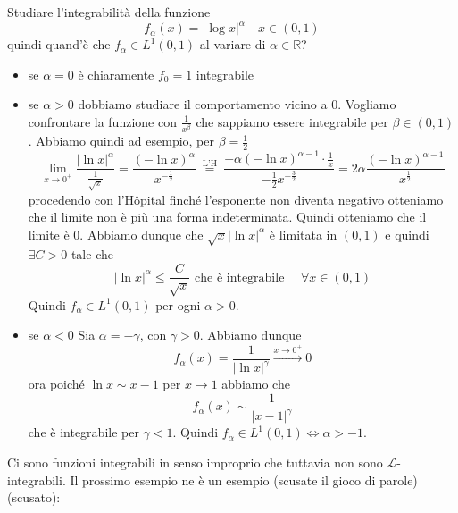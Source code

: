 \begin{eser}
    Studiare l'integrabilità della funzione 
    \[
    f_{\alpha}(x) = {\left| \log x \right|}^{\alpha} \quad x \in (0, 1)
    \]
    quindi quand'è che \(f_\alpha \in L^{1}(0, 1)\) al variare di \(\alpha \in
    \mathbb{R}\)?
\begin{itemize}[label = --]
    \item se \(\alpha = 0\) è chiaramente \(f_0 = 1\) integrabile
    \item se \(\alpha > 0\) dobbiamo studiare il comportamento vicino a \(0\).
        Vogliamo confrontare la funzione con \(\frac{1}{x^{\beta}}\) che
        sappiamo essere integrabile per \(\beta \in (0, 1)\). Abbiamo quindi ad
        esempio, per \(\beta = \frac{1}{2}\) 
        \[
            \lim_{x \to 0^{+}} \frac{{|\ln x|}^{\alpha}}{\frac{1}{\sqrt{x}}} =
            \frac{{(-\ln x)}^{\alpha}}{x^{-\frac{1}{2}}} \overset{\text{ L'H
            }}{=} \frac{- \alpha {(-\ln
            x)}^{\alpha-1} \cdot \frac{1}{x} }{ -\frac{1}{2} x^{-\frac{3}{2}} }
            = 2 \alpha \frac{{(-\ln x)}^{\alpha - 1}}{x^{\frac{1}{2}}}
        \]
        procedendo con l'Hôpital finché l'esponente non diventa negativo
        otteniamo che il limite non è più una forma indeterminata. Quindi
        otteniamo che il limite è \(0\). Abbiamo dunque che \(\sqrt{x} |\ln x
        |^{\alpha}\) è limitata in \((0, 1)\) e quindi \(\exists C >0\) tale che 
        \[
            |\ln x|^{\alpha} \le \frac{C}{\sqrt{x}} \text{ che è integrabile } \quad \forall x \in (0, 1)
        \]
        Quindi \(f_{\alpha} \in L^{1}(0, 1)\) per ogni \(\alpha > 0\).
    \item se \(\alpha < 0\) Sia \(\alpha = -\gamma\), con \(\gamma > 0\).
        Abbiamo dunque
        \[
            f_\alpha (x) = \frac{1}{{|\ln x|}^{\gamma}} \overset{ x \to
            0^{+}}{\longrightarrow} 0
        \]
        ora poiché \(\ln x \sim x - 1\) per \(x \to 1\) abbiamo che 
        \[
            f_\alpha (x) \sim \frac{1}{|x-1|^{\gamma}} 
        \]
        che è integrabile per \(\gamma < 1\). Quindi \(f_{\alpha} \in L^{1}(0,1)
        \iff \alpha > -1\).
\end{itemize}
\end{eser}
\begin{remark}
    Ci sono funzioni integrabili in senso improprio che tuttavia non sono \(\mathcal L\)-integrabili. Il
    prossimo esempio ne è un esempio (scusate il gioco di parole) (scusato):
\end{remark}
